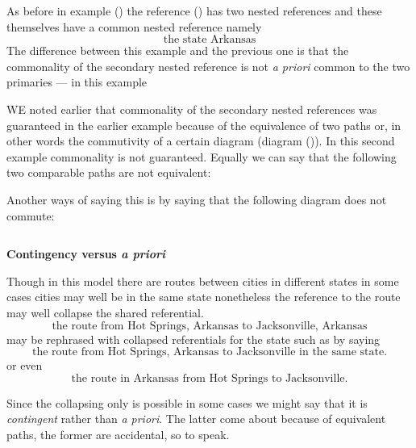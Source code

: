\mynote 
As before in example () the reference () has two nested references and these themselves have a common nested reference namely
\begin{equation*}
\mbox{the state Arkansas}
\end{equation*}
The difference between this example and the previous one is that the commonality of the secondary nested reference is not  \textit{a priori}
 common to the two primaries --- in this example

\mynote
WE noted earlier that commonality of the secondary nested references was guaranteed in the earlier example because of the equivalence of two paths or, in other words the commutivity of a certain diagram (diagram ()).
In this second example commonality is not guaranteed. Equally we can say that the following two comparable paths are not equivalent:

Another ways of saying this is by saying that the following diagram does not commute:
\iffalse
\begin{equation*}

\end{equation*}
\fi

\begin{equation*}

\end{equation*}

\textbf{Contingency versus \textit{a priori}}

Though in this model there are routes between cities in different states in some cases cities may well be in the same state nonetheless the reference to the route may well collapse the shared referential.
\begin{equation}
\mbox{the route from Hot Springs, Arkansas to Jacksonville, Arkansas}
\end{equation}
may be rephrased with collapsed referentials for the state such as by saying
\begin{equation}
\mbox{the route from Hot Springs, Arkansas to Jacksonville in the same state.}
\end{equation}
or even 
\begin{equation}
\mbox{the route in Arkansas from Hot Springs to Jacksonville.}
\end{equation} 

Since the collapsing only is possible in some cases we might say that it is \textit{contingent} rather than \textit{a priori}. The latter come about because of equivalent paths, the former are accidental, so to speak.


